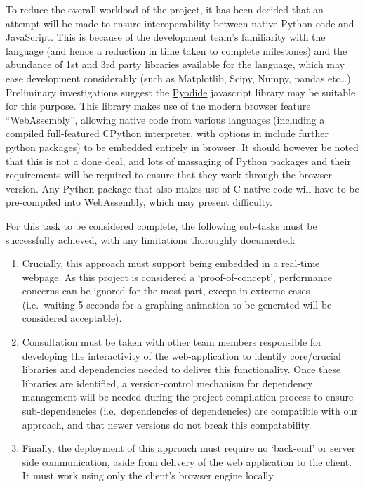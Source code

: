 \documentclass[
  english,
  paper=a4,
  oneside  ,captions=tableheading
]{scrbook}
\begin{document}
To reduce the overall workload of the project, it has been decided that
an attempt will be made to ensure interoperability between native Python
code and JavaScript. This is because of the development team's
familiarity with the language (and hence a reduction in time taken to
complete milestones) and the abundance of 1st and 3rd party libraries
available for the language, which may ease development considerably
(such as Matplotlib, Scipy, Numpy, pandas etc\ldots) Preliminary
investigations suggest the
\href{https://pyodide.org/en/stable/}{Pyodide} javascript library may be
suitable for this purpose. This library makes use of the modern browser
feature ``WebAssembly'', allowing native code from various languages
(including a compiled full-featured CPython interpreter, with options in
include further python packages) to be embedded entirely in browser. It
should however be noted that this is not a done deal, and lots of
massaging of Python packages and their requirements will be required to
ensure that they work through the browser version. Any Python package
that also makes use of C native code will have to be pre-compiled into
WebAssembly, which may present difficulty.

For this task to be considered complete, the following sub-tasks must be
successfully achieved, with any limitations thoroughly documented: 
\begin{enumerate}
	\item Crucially, this approach must support being embedded in a real-time webpage. As this project is considered a `proof-of-concept', performance concerns can be ignored for the most part, except in extreme cases (i.e.~waiting 5 seconds for a graphing animation to be generated will be considered acceptable).
	\item Consultation must be taken with other team members responsible for developing the interactivity of the web-application to identify core/crucial libraries and dependencies needed to deliver this functionality. Once these libraries are identified, a version-control mechanism for dependency management will be needed during the project-compilation process to ensure sub-dependencies (i.e.~dependencies of dependencies) are compatible with our approach, and that newer versions do not break this compatability.
	\item Finally, the deployment of this approach must require no `back-end' or server side communication, aside from delivery of the web application to the client. It must work using only the client's browser engine locally.
\end{enumerate}
\end{document}
